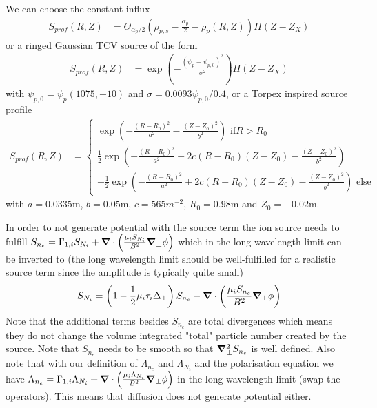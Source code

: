 We can choose the constant influx
\begin{align} \label{eq:electron_source_influx}
    S_{prof}(R,Z) &= \Theta_{\alpha_p/2}\left( \rho_{p,s} - \frac{\alpha_p}{2} - \rho_p(R,Z) \right) H(Z-Z_X)
\end{align}
or a ringed Gaussian TCV source of the form
\begin{align}
    S_{prof}(R,Z) &= \exp\left( -\frac{(\psi_p-\psi_{p,0})^2}{\sigma^2}\right)H(Z-Z_X)
\end{align}
with $\psi_{p,0} = \psi_p(1075, -10)$ and $\sigma = 0.0093\psi_{p,0}/0.4$,
or a Torpex inspired source profile
\begin{align} \label{eq:electron_source_torpex}
  S_{prof}(R,Z) &=
  \begin{cases}
    \exp\left( - \frac{(R-R_0)^2}{a^2 }- \frac{(Z-Z_0)^2}{b^2}\right) \text{ if} R > R_0 \\
    \frac{1}{2}\exp\left( - \frac{(R-R_0)^2}{a^2} -2c(R-R_0)(Z-Z_0)- \frac{(Z-Z_0)^2}{b^2} \right) \\
  +\frac{1}{2}\exp\left( - \frac{(R-R_0)^2}{a^2} +2c(R-R_0)(Z-Z_0)- \frac{(Z-Z_0)^2}{b^2} \right) \text{ else}
              \end{cases}
\end{align}
with $a=0.0335$m, $b=0.05$m, $c=565m^{-2}$, $R_0=0.98$m and $Z_0=-0.02$m.


In order to not generate potential with the source term the
ion source needs to fulfill $S_{n_e} = \Gamma_{1,i}S_{N_i} + {\boldsymbol{\nabla}}\cdot\left( \frac{\mu_i S_{N_i}}{B^2}{\boldsymbol{\nabla}}_{\perp} \phi\right)$ which in the long wavelength limit can be inverted to (the long wavelength limit should be well-fulfilled for a realistic source term since the amplitude is typically quite small)
\begin{align}
    S_{N_i} = \left(1-\frac{1}{2}\mu_i \tau_i \Delta_\perp\right) S_{n_e} -{\boldsymbol{\nabla}}\cdot\left( \frac{\mu_i S_{n_e}}{B^2}{\boldsymbol{\nabla}}_{\perp} \phi\right)
  \label{eq:ion_source}
\end{align}
Note that the additional terms besides $S_{n_e}$ are total divergences which means
they do not change the volume integrated "total" particle number created by the source.
Note that $S_{n_e}$ needs to be smooth
so that ${\boldsymbol{\nabla}}_{\perp}^2 S_{n_e}$ is well defined.
Also note that with our definition of $\Lambda_{n_e}$ and $\Lambda_{N_i}$ and
the polarisation equation we have $\Lambda_{n_e} = \Gamma_{1,i}\Lambda_{N_i} + {\boldsymbol{\nabla}}\cdot\left( \frac{\mu_i \Lambda_{N_i}}{B^2}{\boldsymbol{\nabla}}_{\perp} \phi\right)$ in the long wavelength limit (swap the operators).
This means that diffusion does not generate potential either.

